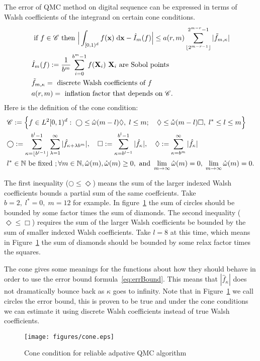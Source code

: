The error of QMC method on digital sequence can be expressed in terms of Walsh coefficients of the integrand on certain cone conditions. 
\begin{align}
    \label{eq:errBound}
    &\text{ if } f \in \mathscr{C}\text{ then } \Big|\int_{[0,1)^d}f(\mathbf{x})\;\textrm{d}\mathbf{x} - \hat{I}_m(f)\Big| \leq a(r,m) \sum_{\lfloor 2^{m-r-1} \rfloor}^{2^{m-r}-1} |\tilde{f}_{m,\kappa}|\\
    &\hat{I}_m(f): = \frac{1}{b^m}\sum_{i=0}^{b^m-1}f(\mathbf{X}_i)
    \text{ $\mathbf{X}_i$ are Sobol points}\notag\\
    &\tilde{f}_{m,\kappa}=\text{ discrete Walsh coefficients of }f \notag\\
    &a(r,m) =\text{ inflation factor that depends on } \mathscr{C} \notag.
\end{align}
Here is the definition of the cone condition:
\begin{align}
   &\mathscr{C}:=\Big\{f\in L^2[0,1)^d:\;\bigcirc \leq \hat{\omega}(m-l)\Diamond,\; l\leq m;\quad
   \Diamond \leq \mathring{\omega}(m-l) \Box, 
   \; l^*\leq l \leq m\Big\}\notag\\
   \label{eq:cone}
   &\bigcirc:= \sum_{\kappa=\lfloor b^{l-1} \rfloor}^{b^l-1} \sum_{\lambda=1}^{\infty}| \hat{f}_{\kappa+\lambda b^m}|,\quad  
   \Box:= \sum_{\kappa=b^{l-1}}^{b^l-1}|\hat{f}_\kappa|,\quad
   \Diamond:=\sum_{\kappa=b^m}^{\infty}|\hat{f}_{\kappa}|\\
   &l^*\in \mathbb{N}\text{ be fixed }; \forall m\in \mathbb{N},\hat{\omega}(m),\mathring{\omega}(m)\geq 0, \text{ and } \lim_{m\to \infty} \hat{\omega}(m)=0,\; \lim_{m\to \infty} \mathring{\omega}(m)=0\notag.
\end{align}

The first inequality ($\bigcirc \leq \Diamond$) means the sum of the larger indexed Walsh coefficients bounds a partial sum of the same coeffcients. 
Take $b=2,\; l^*=0,\; m=12$ for example. 
In figure~\ref{fg:cone} the sum of circles should be bounded by some factor times the sum of diamonds. 
The second inequality ($\Diamond\leq \Box$) requires the sum of the larger Walsh coefficients be bounded by the sum of smaller indexed Walsh coefficients. 
Take $l=8$ at this time, which means in Figure~\ref{fg:cone} the sum of diamonds should be bounded by some relax factor times the squares.

The cone gives some meanings for the functions about how they should behave in order to use the error bound formula~\eqref{eq:errBound}. 
This means that $|\hat{f}_\kappa|$ does not dramatically bounce back as $\kappa$ goes to infinity. 
Note that in Figure~\ref{fg:cone} we call circles the error bound, this is proven to be true and under the cone conditions we can estimate it using discrete Walsh coefficients instead of true Walsh coefficients.
\begin{figure}[h]
    \centering
    \texttt{[image: figures/cone.eps]}
    \caption{Cone condition for reliable adpative QMC algorithm}
    \label{fg:cone}
\end{figure}
